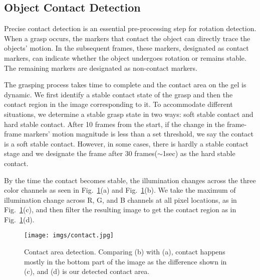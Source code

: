 \subsection{Object Contact Detection}
Precise contact detection is an essential pre-processing step for rotation detection. When a grasp occurs, the markers that contact the object can directly trace the objects' motion. In the subsequent frames, these markers, designated as contact markers, can indicate whether the object undergoes rotation or remains stable. The remaining markers are designated as non-contact markers.

The grasping process takes time to complete and the contact area on the gel is dynamic. We first identify a stable contact state of the grasp and then the contact region in the image corresponding to it. To accommodate different situations, we determine a stable grasp state in two ways: soft stable contact and hard stable contact. After 10 frames from the start, if the change in the frame-frame markers' motion magnitude is less than a set threshold, we say the contact is a soft stable contact. However, in some cases, there is hardly a stable contact stage and we designate the frame after 30 frames($\sim$1sec) as the hard stable contact.

By the time the contact becomes stable, the illumination changes across the three color channels as seen in Fig.~\ref{fig:contact}(a) and Fig.~\ref{fig:contact}(b). We take the maximum of illumination change across R, G, and B channels at all pixel locations, as in Fig.~\ref{fig:contact}(c), and then filter the resulting image to get the contact region as in Fig.~\ref{fig:contact}(d).

\begin{figure}[t]
    \centering
    \texttt{[image: imgs/contact.jpg]}
    \caption{Contact area detection.
    Comparing (b) with (a), contact happens mostly in the bottom part of the image as the difference shown in (c), and (d) is our detected contact area.
    }
    \label{fig:contact}
    \vspace{-5mm}
\end{figure}


